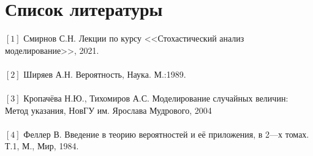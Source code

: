 \documentclass[11pt]{article}
\begin{document}
\newpage
\section{Список литературы}
$[1]$ Смирнов С.Н. Лекции по курсу <<Стохастический анализ моделирование>>, 2021.\\ \\
$[2]$ Ширяев А.Н. Вероятность, Наука. М.:1989. \\ \\
$[3]$ Кропачёва Н.Ю., Тихомиров А.С. Моделирование случайных величин: Метод указания, НовГУ им. Ярослава Мудрового, 2004 \\ \\
$[4]$ Феллер В. Введение в теорию вероятностей и её приложения, в 2---х томах. Т.1, М., Мир, 1984.
\end{document}
